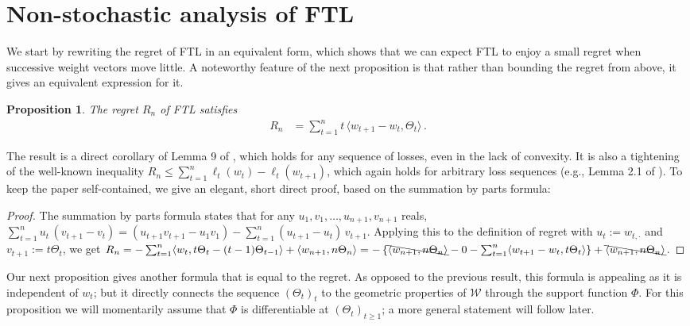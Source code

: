 \documentclass[english]{article}
\newcommand{\cW}{\mathcal{W}}
\newcommand{\ip}[1]{\langle#1\rangle}
\newtheorem{prop}[thm]{Proposition}
\begin{document}
\section{Non-stochastic analysis of FTL}
\label{sec:FTL}
We start by rewriting the regret of FTL in an equivalent form, which shows that we can expect FTL to enjoy a small
regret when successive weight vectors move little. 
A noteworthy feature of the next proposition is that rather than bounding the regret from above, it gives an equivalent
expression for it. 
\begin{prop}
\label{prop:regretabel}
The regret $R_n$ of FTL satisfies
\begin{align*}
R_n & =  \sum_{t=1}^n t\,\ip{ w_{t+1}-w_t,\Theta_t}  \,.
\end{align*}
\end{prop}
The result is a direct corollary of Lemma 9 of \citet{McMahan10:Equiv}, which holds 
for any sequence of losses, even in the lack of convexity.
It is also a tightening of the well-known inequality $R_n \le \sum_{t=1}^n \ell_t(w_t)-\ell_t(w_{t+1})$,
which again holds for arbitrary loss sequences (e.g., Lemma 2.1 of \citet{SS12:Book}).
To keep the paper self-contained, we give an elegant, short direct proof, based on the summation by parts formula:
\begin{proof}
The summation by parts formula states that for any $u_1,v_1,\dots,u_{n+1},v_{n+1}$ reals,
$
\sum_{t=1}^n u_t\,(v_{t+1}-v_t) = (u_{t+1}v_{t+1}-u_1 v_1) - \sum_{t=1}^n (u_{t+1}-u_t)\,v_{t+1} 
$.
Applying this to the definition of regret
with $u_t:=w_{t,\cdot}$ and $v_{t+1} := t\Theta_{t}$, we get
$
R_n 
 = -\sum_{t=1}^n \ip{w_t,t\Theta_t - (t-1)\Theta_{t-1}} + \ip{w_{n+1},n\Theta_n}  
 = - \left\{ 
		\bcancel{\ip{w_{n+1},n\Theta_n}} - 0 - \sum_{t=1}^n \ip{w_{t+1}-w_t,t\Theta_t}  \right\} +
		\bcancel{\ip{w_{n+1},n\Theta_n}}
$.
\end{proof}
Our next proposition gives another formula that is equal to the regret.
As opposed to the previous result, this formula is appealing as
it is independent of $w_t$; but it directly connects the sequence $(\Theta_t)_t$ to the 
geometric properties of $\cW$ through the support function $\Phi$.
For this proposition we will momentarily assume that $\Phi$ is differentiable at $(\Theta_t)_{t\ge 1}$;
a more general statement will follow later.
\end{document}
